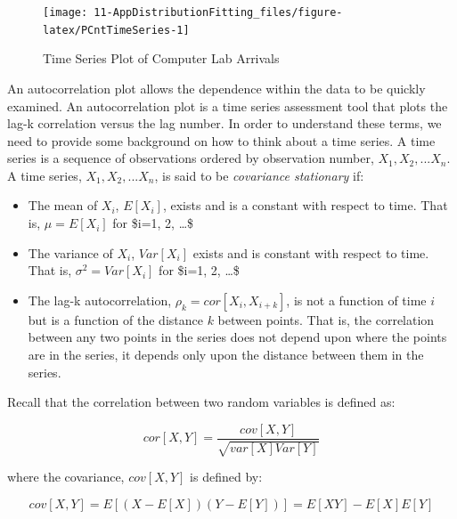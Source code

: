 \documentclass[
]{book}
\theoremstyle{definition}
\theoremstyle{definition}
\theoremstyle{definition}
\theoremstyle{definition}
\theoremstyle{remark}
\begin{document}
\begin{figure}

{\centering \texttt{[image: 11-AppDistributionFitting\_files/figure-latex/PCntTimeSeries-1]} 

}

\caption{Time Series Plot of Computer Lab Arrivals}\label{fig:PCntTimeSeries}
\end{figure}

An autocorrelation plot allows the dependence within the data to be
quickly examined. An autocorrelation plot is a time series assessment
tool that plots the lag-k correlation versus the lag number. In order to
understand these terms, we need to provide some background on how to
think about a time series. A time series is a sequence of observations
ordered by observation number, \(X_{1}, X_{2},...X_{n}\). A time series, \(X_{1}, X_{2},...X_{n}\), is said to be \emph{covariance stationary} if:

\begin{itemize}
\item
  The mean of \(X_{i}\), \(E[X_{i}]\), exists and is a constant with
  respect to time. That is, \(\mu = E[X_{i}]\) for \$i=1, 2, \dots \$~
\item
  The variance of \(X_{i}\), \(Var[X_{i}]\) exists and is constant with
  respect to time. That is, \(\sigma^{2} = Var[X_{i}]\) for
  \$i=1, 2, \dots \$~
\item
  The lag-k autocorrelation, \(\rho_{k} = cor[X_{i},X_{i+k}]\), is not
  a function of time \(i\) but is a function of the distance \(k\) between
  points. That is, the correlation between any two points in the
  series does not depend upon where the points are in the series, it
  depends only upon the distance between them in the series.
\end{itemize}

Recall that the correlation between two random variables is defined as:

\[cor[X,Y] = \frac{cov[X,Y]}{\sqrt{var[X] Var[Y]}}\]

where the covariance, \(cov[X,Y]\) is defined by:

\[cov[X,Y] = E[\left(X-E[X]\right)\left(Y-E[Y]\right)] = E[XY] - E[X]E[Y]\]
\end{document}
